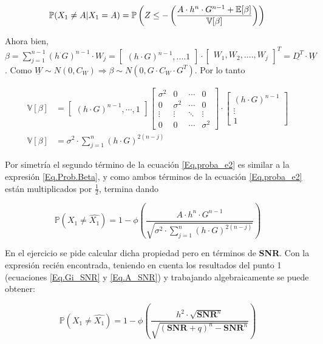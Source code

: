 			\begin{equation}
				\mathbb{P}(X_1 \neq A | X_1 = A) = \mathbb{P} \left( Z\leq - \left(\frac{A \cdot h^n \cdot G^{n-1} + \mathbb{E}[\beta]}{\mathbb{V}[\beta]} \right) \right)
				\label{Eq.Prob.Beta} \\
			\end{equation}

\indent Ahora bien, $\beta = \sum_{j=1}^{n-1} (h ^\cdot G)^{n-1} \cdot W_j = \begin{bmatrix} (h \cdot G)^{n-1}, .... 1 \end{bmatrix} \cdot \begin{bmatrix} W_1, W_2, ...., W_j \end{bmatrix} ^T = \underline{D^T} \cdot \underline{W}$. Como $\underline{W} \sim N(0,C_W) \Rightarrow \beta \sim N(0, G \cdot C_W \cdot G^T)$. Por lo tanto

				\begin{align*}
				\mathbb{V}[\beta] &= \begin{bmatrix} (h \cdot G)^{n-1}, \cdots ,1 \end{bmatrix} \begin{bmatrix} \sigma ^2 & 0 & \cdots & 0 \\ 0 & \sigma ^2 & \cdots & 0 \\ \vdots & \vdots & \ddots & \vdots \\ 0 & 0 & \cdots & \sigma ^2\end{bmatrix} \cdot \begin{bmatrix} (h \cdot G)^{n-1}\\ \vdots \\ 1 \end{bmatrix} \\
				\mathbb{V}[\beta] &= \sigma ^2 \cdot \sum_{j=1}^{n}(h \cdot G)^{2(n-j)}
				\end{align*}

\indent Por simetría el segundo término de la ecuación \ref{Eq.proba_e2} es similar a la expresión \ref{Eq.Prob.Beta}, y como ambos términos de la ecuación \ref{Eq.proba_e2} están multiplicados por $\frac{1}{2}$, termina dando

				\begin{equation}
				\mathbb{P}(X_1 \neq \widehat{X_1}) = 1 - \phi \left( \frac{A \cdot h^n \cdot G^{n-1}}{\sqrt{\sigma ^2 \cdot \sum_{j=1}^{n} (h \cdot G)^{2(n-j)}}}	 \right) 
				\end{equation}		

\indent En el ejercicio se pide calcular dicha propiedad pero en términos de \textbf{SNR}. Con la expresión recién encontrada, teniendo en cuenta los resultados del punto 1 (ecuaciones \ref{Eq.Gi_SNR} y \ref{Eq.A_SNR}) y trabajando algebraicamente se puede obtener:

				\begin{equation}
					\mathbb{P}(X_1 \neq \widehat{X_1}) = 1 - \phi \left( \frac{h^2 \cdot \sqrt{\textbf{SNR}^n}}{\sqrt{(\textbf{SNR}+q)^n -\textbf{SNR}^n}} \right)
					\label{Eq.prob_SNR}					
				\end{equation} 	